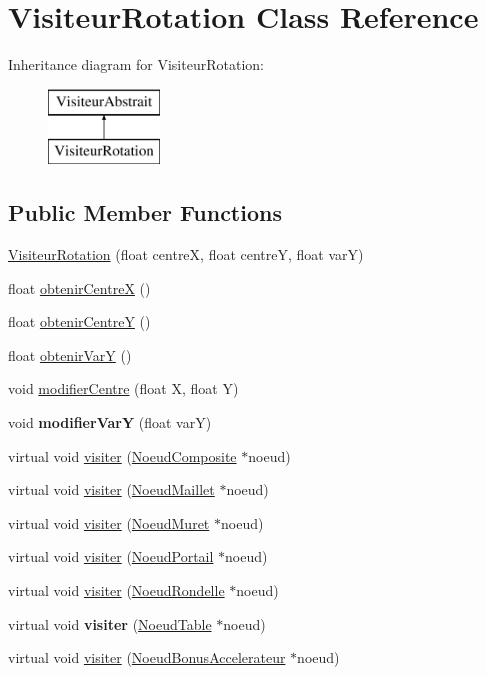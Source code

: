 \hypertarget{class_visiteur_rotation}{}\section{Visiteur\+Rotation Class Reference}
\label{class_visiteur_rotation}
Inheritance diagram for Visiteur\+Rotation\+:\begin{figure}[H]
\begin{center}
\leavevmode
\includegraphics[height=2.000000cm]{class_visiteur_rotation}
\end{center}
\end{figure}
\subsection*{Public Member Functions}
\begin{DoxyCompactItemize}
\item 
\hyperlink{group__inf2990_ga18c6ce771b0372f1ae0972bdfbb961db}{Visiteur\+Rotation} (float centreX, float centreY, float varY)
\item 
float \hyperlink{group__inf2990_gab2365dc2295d046daf14cb3a52a61b41}{obtenir\+CentreX} ()
\item 
float \hyperlink{group__inf2990_ga04725f30de6cb19bc3a454ca5277afb9}{obtenir\+CentreY} ()
\item 
float \hyperlink{group__inf2990_ga8a151654f1636823250dc281de697ceb}{obtenir\+VarY} ()
\item 
void \hyperlink{group__inf2990_gad972a3de4ea8cffa5e81f99be35702dd}{modifier\+Centre} (float X, float Y)
\item 
void {\bfseries modifier\+VarY} (float varY)
\item 
virtual void \hyperlink{group__inf2990_ga8b2f030257b78e64844d3d6526fad507}{visiter} (\hyperlink{class_noeud_composite}{Noeud\+Composite} $\ast$noeud)
\item 
virtual void \hyperlink{group__inf2990_gaae32e22552eb3261ac6d5eaf8812acd8}{visiter} (\hyperlink{class_noeud_maillet}{Noeud\+Maillet} $\ast$noeud)
\item 
virtual void \hyperlink{group__inf2990_gaeb02b7e545154c48ea047ba90aa547ee}{visiter} (\hyperlink{class_noeud_muret}{Noeud\+Muret} $\ast$noeud)
\item 
virtual void \hyperlink{group__inf2990_gaed9327add2f03b3874c84629b7f8d1dd}{visiter} (\hyperlink{class_noeud_portail}{Noeud\+Portail} $\ast$noeud)
\item 
virtual void \hyperlink{group__inf2990_gae090f20239c6bf70aa11b858aa79a4fa}{visiter} (\hyperlink{class_noeud_rondelle}{Noeud\+Rondelle} $\ast$noeud)
\item 
virtual void {\bfseries visiter} (\hyperlink{class_noeud_table}{Noeud\+Table} $\ast$noeud)
\item 
virtual void \hyperlink{group__inf2990_ga30b9ecc99d9bb3f86963f795ee76a1c4}{visiter} (\hyperlink{class_noeud_bonus_accelerateur}{Noeud\+Bonus\+Accelerateur} $\ast$noeud)
\end{DoxyCompactItemize}
